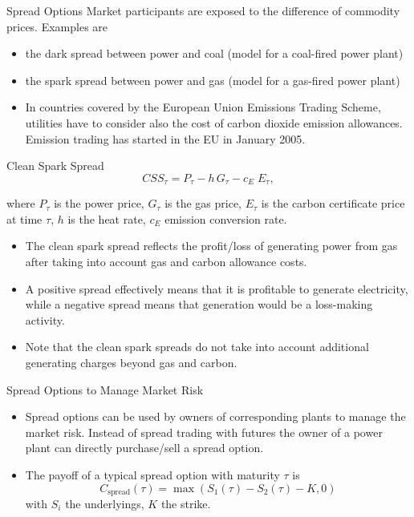 {Spread Options}
Market participants are exposed to the difference of
commodity prices. Examples are
\begin{itemize}
  \item the dark spread between power and coal (model for a coal-fired power plant)
  \item the spark spread between power and gas (model for a gas-fired power plant)
  \item In countries covered by the European Union Emissions Trading Scheme, utilities have to consider also the cost of carbon dioxide emission allowances. Emission trading has started in the EU in January 2005.

\end{itemize}

{Clean Spark Spread}
\begin{equation}
CSS_\tau= P_\tau - h\,G_\tau- c_E\;E_\tau,
\label{clean_spark_spread}
\end{equation}

where $P_\tau$ is the power price, $G_\tau$ is the gas price, $E_\tau$ is the carbon certificate price at time $\tau$, $h$ is the heat rate, $c_E$ emission conversion rate.

\begin{itemize}
\item
The clean spark spread reflects the profit/loss of generating power from gas after taking into account gas and carbon allowance costs.
\item A positive spread effectively means that it is profitable to generate electricity, while a negative spread means that generation would be a loss-making activity.
\item Note that the clean spark spreads do not take into account additional generating charges beyond gas and carbon.
\end{itemize}


{Spread Options to Manage Market Risk}
\begin{itemize}
\item<1-> Spread options can be used by owners of corresponding plants to
manage the market risk. Instead of spread trading with futures the owner of a power plant can directly purchase/sell a spread option.
\item<2->
The payoff of a typical spread option with maturity $\tau$ is
$$C_{\mbox{spread}}{(\tau)}=\max(S_1(\tau)-S_2(\tau)-K,0)$$ with $S_i$ the
underlyings, $K$ the strike.
\end{itemize}

